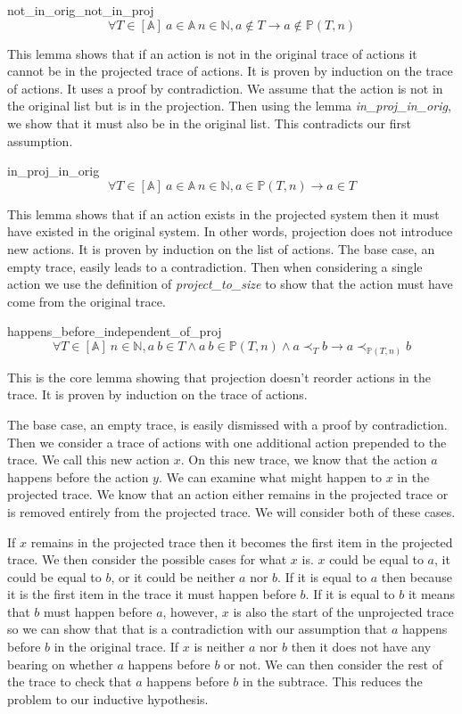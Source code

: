 \documentclass[runningheads]{llncs}
\newcommand{\action}{\mathds{A}}
\newcommand{\listaction}{[\action]}
\newcommand{\happensbefore}{\prec_T}
\newcommand{\projectsize}[2]{\mathds{P}(#1, #2)}
\begin{document}
\begin{lemma}{not\_in\_orig\_not\_in\_proj}
$$ \forall T \in \listaction\ a \in \action\ n \in \mathds{N}, a \notin T  \longrightarrow a \notin \projectsize{T}{n} $$
\end{lemma}
This lemma shows that if an action is not in the original trace of actions it cannot be in the projected trace of actions. It is proven by induction on the trace of actions. It uses a proof by contradiction. We assume that the action is not in the original list but is in the projection. Then using the lemma \emph{in\_proj\_in\_orig}, we show that it must also be in the original list. This contradicts our first assumption.

\begin{lemma}{in\_proj\_in\_orig}
$$ \forall T \in \listaction\ a \in \action\ n \in \mathds{N}, a \in \projectsize{T}{n} \longrightarrow  a \in T $$
\end{lemma}
This lemma shows that if an action exists in the projected system then it must have existed in the original system. In other words, projection does not introduce new actions.
 It is proven by induction on the list of actions. The base case, an empty trace, easily leads to a contradiction. Then when considering a single action we use the definition of \emph{project\_to\_size} to show that the action must have come from the original trace. 

\begin{lemma}{happens\_before\_independent\_of\_proj}
$$ \forall T \in \listaction\ n \in \mathds{N},
a\ b \in T \wedge a\ b \in \projectsize{T}{n} \wedge a \happensbefore b \longrightarrow a \prec_{\projectsize{T}{n}} b
$$
\end{lemma}
This is the core lemma showing that projection doesn't reorder actions in the trace. It is proven by induction on the trace of actions. 

The base case, an empty trace, is easily dismissed with a proof by contradiction. 
Then we consider a trace of actions with one additional action prepended to the trace. We call this new action $x$. On this new trace, we know that the action $a$ happens before the action $y$.
We can examine what might happen to $x$ in the projected trace.
We know that an action either remains in the projected trace or is removed entirely from the projected trace.
We will consider both of these cases.

If $x$ remains in the projected trace then it becomes the first item in the projected trace. 
We then consider the possible cases for what $x$ is.
$x$ could be equal to $a$, it could be equal to $b$, or it could be neither $a$ nor $b$.
If it is equal to $a$ then because it is the first item in the trace it must happen before $b$.
If it is equal to $b$ it means that $b$ must happen before $a$, however, $x$ is also the start of the unprojected trace so we can show that that is a contradiction with our assumption that $a$ happens before $b$ in the original trace.
If $x$ is neither $a$ nor $b$ then it does not have any bearing on whether $a$ happens before $b$ or not. We can then consider the rest of the trace to check that $a$ happens before $b$ in the subtrace. This reduces the problem to our inductive hypothesis.
\end{document}
